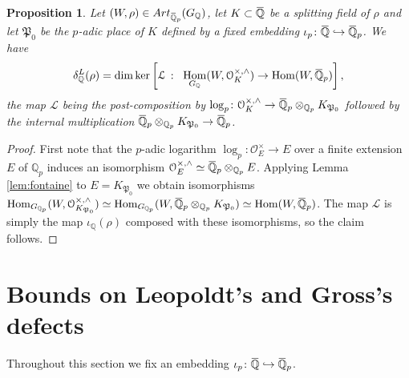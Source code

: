 \documentclass[12pt]{amsart}
\newcommand{\Q}{\mathbb{Q}}
\newcommand\bQ{\mathbb{Q}}
\newcommand\Qp{{\mathbb{Q}_p}}
\newcommand\cL{\mathcal{L}}
\newcommand\cO{\mathcal{O}}
\newcommand\gP{\mathfrak{P}}
\newcommand{\ob}[1]{\mkern 1.5mu\overline{\mkern-1.5mu#1\mkern-1.5mu}\mkern 1.5mu}
\newcommand{\Art}{\textrm{Art}}
\DeclareMathOperator{\Hom}{Hom}
\theoremstyle{defstyle}
\theoremstyle{thmstyle}
\newtheorem{proposition}[subsubsection]{Proposition}
\begin{document}
	\begin{proposition}\label{prop:alternate_decription_leopoldt_defect}
		Let $(W,\rho)\in \Art_{\ob{\bQ}_p}(G_\Q)$, let $K\subset \ob{\Q}$ be a splitting field of $\rho$ and let $\gP_0$ be the $p$-adic place of $K$ defined by a fixed embedding $\iota_p \colon \ob{\Q} \hookrightarrow \ob{\Q}_p$. We have 
		\[\delta^\textbf{L}_\Q(\rho)=\dim \ker \left[\cL \ \colon\ \Hom_{G_{\Q}}(W,\cO_K^{\times,\wedge}) \rightarrow \Hom(W,\ob{\Q}_p)\right], \]
		the map $\cL$ being the post-composition by $\log_p  \colon \cO_K^{\times,\wedge} \to \ob{\Q}_p \otimes_{\Qp} K_{\gP_0}$ followed by the internal multiplication $\ob{\Q}_p \otimes_{\Qp} K_{\gP_0} \to \ob{\Q}_p$.
	\end{proposition}
	\begin{proof}
		First note that the $p$-adic logarithm $\log_p \colon \cO_E^\times \rightarrow E$ over a finite extension $E$ of $\Qp$ induces an isomorphism $\cO_E^{\times,\wedge} \simeq \ob{\bQ}_p \otimes_{\Qp} E$. Applying Lemma \ref{lem:fontaine} to $E=K_{\gP_0}$ we obtain isomorphisms 
		$\Hom_{G_{\Q_p}}(W,\cO_{K_{\gP_0}}^{\times,\wedge})\simeq \Hom_{G_{\Q_p}}(W,\ob{\Q}_p \otimes_{\Qp}K_{\gP_0})\simeq \Hom(W,\ob{\Q}_p)$. The map $\cL$ is simply the map $\iota_{\Q}(\rho)$ composed with these isomorphisms, so the claim follows.
	\end{proof}
	
	\section{Bounds on Leopoldt's and Gross's defects}\label{sec:bounds}
	Throughout this section we fix an embedding $\iota_p \colon \ob{\Q} \hookrightarrow \ob{\Q}_p$.
\end{document}
